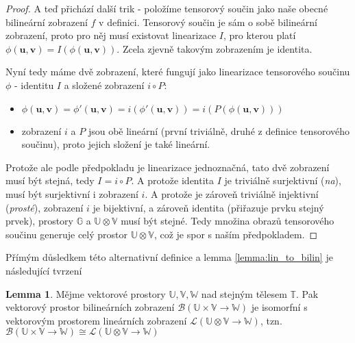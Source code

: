 \documentclass[a5paper,12pt]{amsbook}
\theoremstyle{definition}
\newtheorem{lemma}[theorem]{Lemma}
\newcommand{\myvec}[1]{\bm{#1}}
\newcommand{\myspace}[1]{\mathbb{#1}}
\begin{document}
\begin{proof}
A teď přichází další trik - položíme tensorový součin jako naše obecné bilineární zobrazení
$f$ v definici. Tensorový součin je sám o sobě bilineární zobrazení, proto pro něj musí existovat
linearizace $I$, pro kterou platí $\phi(\myvec{u}, \myvec{v}) = I(\phi(\myvec{u}, \myvec{v}))$.
Zcela zjevně takovým zobrazením je identita.

Nyní tedy máme dvě zobrazení, které fungují jako linearizace tensorového součinu $\phi$ - identitu
$I$ a složené zobrazení $i \circ P$:
\begin{itemize}
\item $\phi(\myvec{u}, \myvec{v}) = \phi'(\myvec{u}, \myvec{v}) = i(\phi'(\myvec{u}, \myvec{v}))
    = i(P(\phi(\myvec{u}, \myvec{v})))$
\item zobrazení $i$ a $P$ jsou obě lineární (první triviálně, druhé z definice tensorového součinu),
    proto jejich složení je také lineární.
\end{itemize}
Protože ale podle předpokladu je linearizace jednoznačná, tato dvě zobrazení musí být stejná,
tedy $I = i \circ P$. A protože identita $I$ je triviálně surjektivní (\textit{na}), musí být
surjektivní i zobrazení $i$. A protože je zároveň triviálně injektivní (\textit{prosté}), zobrazení
$i$ je bijektivní, a zároveň identita (přiřazuje prvku stejný prvek), prostory $\myspace{G}$
a $\myspace{U}\otimes\myspace{V}$ musí být stejné. Tedy množina obrazů tensorového součinu generuje
celý prostor $\myspace{U}\otimes\myspace{V}$, což je spor s naším předpokladem.
\end{proof}

\noindent
Přímým důsledkem této alternativní definice a lemma \ref{lemma:lin_to_bilin} je následující
tvrzení

\begin{lemma}
Mějme vektorové prostory $\myspace{U}, \myspace{V}, \myspace{W}$ nad stejným tělesem $\myspace{T}$.
Pak vektorový prostor bilineárních zobrazení
$\mathcal{B}(\myspace{U}\times\myspace{V}\rightarrow\myspace{W})$
je isomorfní s vektorovým prostorem lineárních zobrazení
$\mathcal{L}(\myspace{U}\otimes\myspace{V}\rightarrow\myspace{W})$, tzn.
$\mathcal{B}(\myspace{U}\times\myspace{V}\rightarrow\myspace{W}) \cong
\mathcal{L}(\myspace{U}\otimes\myspace{V}\rightarrow\myspace{W})$
\end{lemma}
\end{document}
